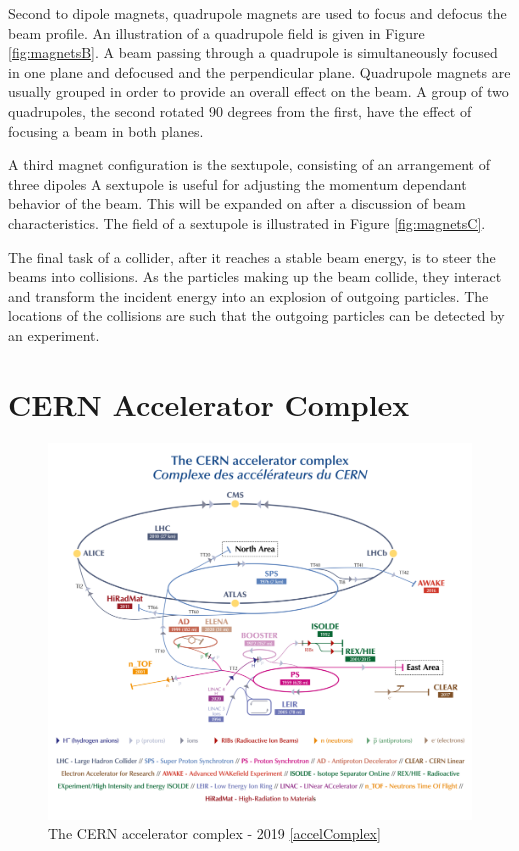 Second to dipole magnets, quadrupole magnets are used to focus and defocus the beam profile.
An illustration of a quadrupole field is given in Figure \ref{fig:magnetsB}.
A beam passing through a quadrupole is simultaneously focused in one plane and defocused and the perpendicular plane.
Quadrupole magnets are usually grouped in order to provide an overall effect on the beam.
A group of two quadrupoles, the second rotated 90 degrees from the first, have the effect of focusing a beam in both planes.

A third magnet configuration is the sextupole, consisting of an arrangement of three dipoles
A sextupole is useful for adjusting the momentum dependant behavior of the beam. This will be expanded on after a discussion of beam characteristics.
The field of a sextupole is illustrated in Figure \ref{fig:magnetsC}.

The final task of a collider, after it reaches a stable beam energy, is to steer the beams into collisions.
As the particles making up the beam collide, they interact and transform the incident energy into an explosion of outgoing particles.
The locations of the collisions are such that the outgoing particles can be detected by an experiment.

\section{CERN Accelerator Complex}

\begin{figure}[h!]
\captionsetup[subfigure]{position=b}
\centering
\includegraphics[width=1.0\textwidth]{figures/experiment/accelComplex-small.png}
\caption{The CERN accelerator complex - 2019 \ref{accelComplex}}
\label{fig:accelComplex}
\end{figure}

